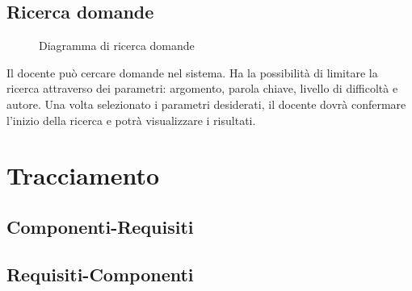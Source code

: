\documentclass[a4paper, titlepage]{article}
\begin{document}
\newpage
\subsection{Ricerca domande}
\begin{figure}[H]
	\centering
	\noindent{}
	\caption{Diagramma di ricerca domande}
\end{figure}
Il docente può cercare domande nel sistema. Ha la possibilità di limitare la ricerca attraverso dei parametri: argomento, parola chiave, livello di difficoltà e autore. Una volta selezionato i parametri desiderati, il docente dovrà confermare l’inizio della ricerca e potrà visualizzare i risultati. 
\newpage


\section{Tracciamento}

\subsection{Componenti-Requisiti}


\subsection{Requisiti-Componenti}

\end{document}
